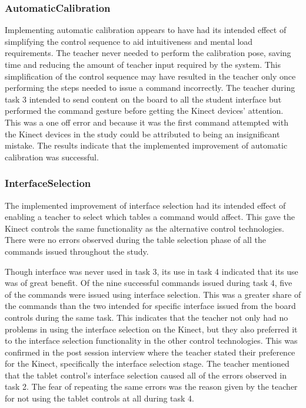 \documentclass[link]{IWCOMP}
\begin{document}
\subsubsection{AutomaticCalibration}
\label{subsubsec:discussionSuccessAutomaticCalibration}

Implementing automatic calibration appears to have had its intended effect of simplifying the control sequence to aid intuitiveness and mental load requirements.
The teacher never needed to perform the calibration pose, saving time and reducing the amount of teacher input required by the system.
This simplification of the control sequence may have resulted in the teacher only once performing the steps needed to issue a command incorrectly.
The teacher during task 3 intended to send content on the board to all the student interface but performed the command gesture before getting the Kinect devices' attention.
This was a one off error and because it was the first command attempted with the Kinect devices in the study could be attributed to being an insignificant mistake.
The results indicate that the implemented improvement of automatic calibration was successful.

\subsubsection{InterfaceSelection}
\label{subsubsec:discussionSuccessInterfaceSelection}

The implemented improvement of interface selection had its intended effect of enabling a teacher to select which tables a command would affect.
This gave the Kinect controls the same functionality as the alternative control technologies.
There were no errors observed during the table selection phase of all the commands issued throughout the study.

Though interface was never used in task 3, its use in task 4 indicated that its use was of great benefit.
Of the nine successful commands issued during task 4, five of the commands were issued using interface selection.
This was a greater share of the commands than the two intended for specific interface issued from the board controls during the same task.
This indicates that the teacher not only had no problems in using the interface selection on the Kinect, but they also preferred it to the interface selection functionality in the other control technologies.
This was confirmed in the post session interview where the teacher stated their preference for the Kinect, specifically the interface selection stage.
The teacher mentioned that the tablet control's interface selection caused all of the errors observed in task 2.
The fear of repeating the same errors was the reason given by the teacher for not using the tablet controls at all during task 4.
\end{document}
